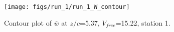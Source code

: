\begin{figure}[H]
\centering
\texttt{[image: figs/run\_1/run\_1\_W\_contour]}
\caption{Contour plot of $\overline{w}$ at $z/c$=5.37, $V_{free}$=15.22, station 1.}
\label{fig:run_1_W_contour}
\end{figure}


